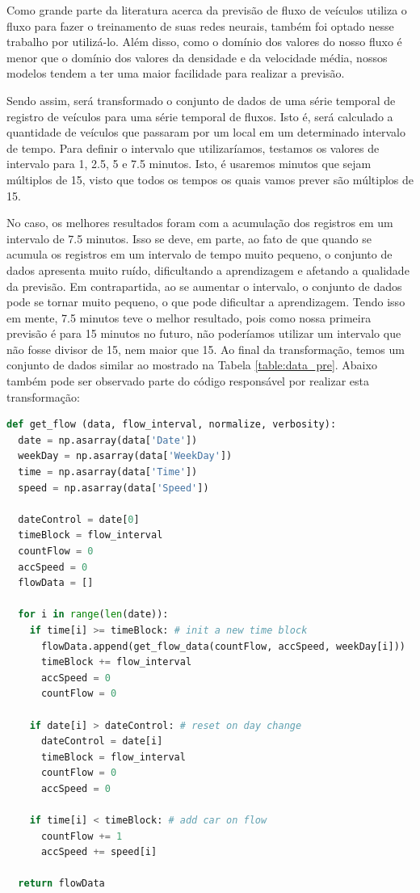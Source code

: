 Como grande parte da literatura acerca da previsão de fluxo de veículos utiliza o fluxo para fazer o treinamento de suas redes neurais, também foi optado nesse trabalho por utilizá-lo. Além disso, como o domínio dos valores do nosso fluxo é menor que o domínio dos valores da densidade e da velocidade média, nossos modelos tendem a ter uma maior facilidade para realizar a previsão.

Sendo assim, será transformado o conjunto de dados de uma série temporal de registro de veículos para uma série temporal de fluxos. Isto é, será calculado a quantidade de veículos que passaram por um local em um determinado intervalo de tempo. Para definir o intervalo que utilizaríamos, testamos os valores de intervalo para 1, 2.5, 5 e 7.5 minutos. Isto, é usaremos minutos que sejam múltiplos de 15, visto que todos os tempos os quais vamos prever são múltiplos de 15.

No caso, os melhores resultados foram com a acumulação dos registros em um intervalo de 7.5 minutos. Isso se deve, em parte, ao fato de que quando se acumula os registros em um intervalo de tempo muito pequeno, o conjunto de dados apresenta muito ruído, dificultando a aprendizagem e afetando a qualidade da previsão. Em contrapartida, ao se aumentar o intervalo, o conjunto de dados pode se tornar muito pequeno, o que pode dificultar a aprendizagem. Tendo isso em mente, 7.5 minutos teve o melhor resultado, pois como nossa primeira previsão é para 15 minutos no futuro, não poderíamos utilizar um intervalo que não fosse divisor de 15, nem maior que 15. Ao final da transformação, temos um conjunto de dados similar ao mostrado na Tabela \ref{table:data_pre}. Abaixo também pode ser observado parte do código responsável por realizar esta transformação:

\begin{lstlisting}[language=Python, caption = GetFlow Python Function]
def get_flow (data, flow_interval, normalize, verbosity):
  date = np.asarray(data['Date'])
  weekDay = np.asarray(data['WeekDay'])
  time = np.asarray(data['Time'])
  speed = np.asarray(data['Speed'])
  
  dateControl = date[0]
  timeBlock = flow_interval
  countFlow = 0
  accSpeed = 0
  flowData = []

  for i in range(len(date)):
    if time[i] >= timeBlock: # init a new time block
      flowData.append(get_flow_data(countFlow, accSpeed, weekDay[i])) 
      timeBlock += flow_interval
      accSpeed = 0
      countFlow = 0
      
    if date[i] > dateControl: # reset on day change
      dateControl = date[i]
      timeBlock = flow_interval 
      countFlow = 0
      accSpeed = 0
      
    if time[i] < timeBlock: # add car on flow
      countFlow += 1
      accSpeed += speed[i]

  return flowData

\end{lstlisting}

